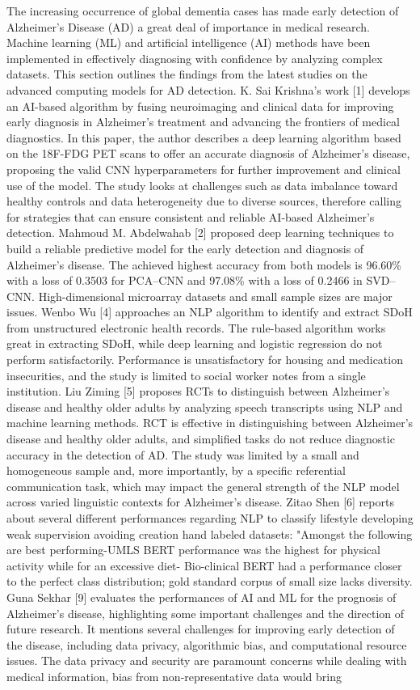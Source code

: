 \documentclass[conference]{IEEEtran} %
\begin{document}
The increasing occurrence of global dementia cases has made early detection of Alzheimer's Disease (AD) a great deal of importance in medical research. Machine learning (ML) and artificial intelligence (AI) methods have been implemented in effectively diagnosing with confidence by analyzing complex datasets. This section outlines the findings from the latest studies on the advanced computing models for AD detection. K. Sai Krishna's work [1] develops an AI-based algorithm by fusing neuroimaging and clinical data for improving early diagnosis in Alzheimer's treatment and advancing the frontiers of medical diagnostics. In this paper, the author describes a deep learning algorithm based on the 18F-FDG PET scans to offer an accurate diagnosis of Alzheimer's disease, proposing the valid CNN hyperparameters for further improvement and clinical use of the model. The study looks at challenges such as data imbalance toward healthy controls and data heterogeneity due to diverse sources, therefore calling for strategies that can ensure consistent and reliable AI-based Alzheimer's detection. Mahmoud M. Abdelwahab [2] proposed deep learning techniques to build a reliable predictive model for the early detection and diagnosis of Alzheimer's disease. The achieved highest accuracy from both models is 96.60\% with a loss of 0.3503 for PCA–CNN and 97.08\% with a loss of 0.2466 in SVD–CNN. High-dimensional microarray datasets and small sample sizes are major issues. Wenbo Wu [4] approaches an NLP algorithm to identify and extract SDoH from unstructured electronic health records. The rule-based algorithm works great in extracting SDoH, while deep learning and logistic regression do not perform satisfactorily. Performance is unsatisfactory for housing and medication insecurities, and the study is limited to social worker notes from a single institution. Liu Ziming [5] proposes RCTs to distinguish between Alzheimer's disease and healthy older adults by analyzing speech transcripts using NLP and machine learning methods. RCT is effective in distinguishing between Alzheimer's disease and healthy older adults, and simplified tasks do not reduce diagnostic accuracy in the detection of AD. The study was limited by a small and homogeneous sample and, more importantly, by a specific referential communication task, which may impact the general strength of the NLP model across varied linguistic contexts for Alzheimer's disease. Zitao Shen [6] reports about several different performances regarding NLP to classify lifestyle developing weak supervision avoiding creation hand labeled datasets: "Amongst the following are best performing-UMLS BERT performance was the highest for physical activity while for an excessive diet- Bio-clinical BERT had a performance closer to the perfect class distribution; gold standard corpus of small size lacks diversity. Guna Sekhar [9] evaluates the performances of AI and ML for the prognosis of Alzheimer's disease, highlighting some important challenges and the direction of future research. It mentions several challenges for improving early detection of the disease, including data privacy, algorithmic bias, and computational resource issues. The data privacy and security are paramount concerns while dealing with medical information, bias from non-representative data would bring 
\end{document}
